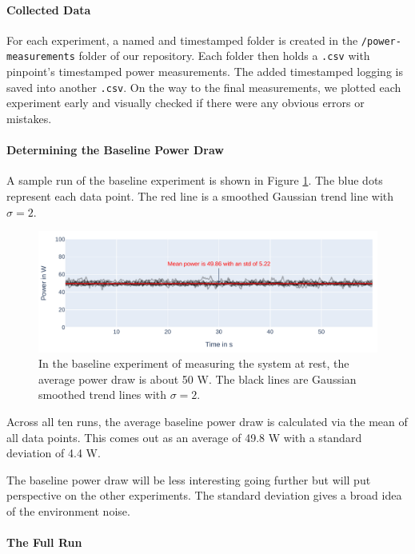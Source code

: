 \newpage
\paragraph{Collected Data}

For each experiment, a named and timestamped folder is created in the \verb|/power-measurements| folder of our repository. 
Each folder then holds a \verb|.csv| with pinpoint's timestamped power measurements. 
The added timestamped logging is saved into another \verb|.csv|. 
On the way to the final measurements, we plotted each experiment early and visually checked if there were any obvious errors or mistakes.

\paragraph{Determining the Baseline Power Draw}

A sample run of the baseline experiment is shown in Figure \ref{fig:plot_baseline}.
The blue dots represent each data point. The red line is a smoothed Gaussian trend line with $\sigma = 2$. 

\begin{figure}[H]
    \includegraphics[width=\linewidth]{power-measurements/stacked_plots/sleep_0714.pdf}
    \caption{In the baseline experiment of measuring the system at rest, the average power draw is about 50 W. The black lines are Gaussian smoothed trend lines with $\sigma = 2$.}
    \label{fig:plot_baseline}
\end{figure}

Across all ten runs, the average baseline power draw is calculated via the mean of all data points. This comes out as an average of 49.8 W with a standard deviation of 4.4 W.

The baseline power draw will be less interesting going further but will put perspective on the other experiments. 
The standard deviation gives a broad idea of the environment noise.

\paragraph{The Full Run}

